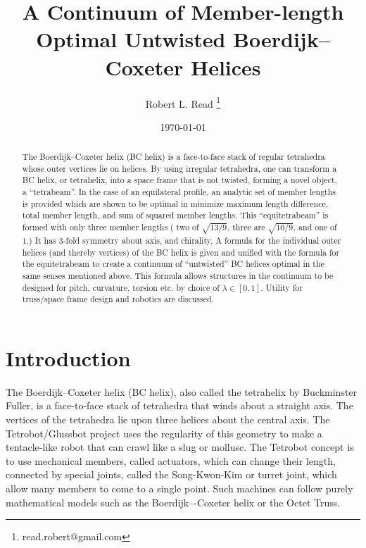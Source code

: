 \documentclass[11pt]{article}
\title{A Continuum of Member-length Optimal Untwisted Boerdijk--Coxeter Helices}
\author{Robert L. Read
  \thanks{read.robert@gmail.com}
}
\affil{Founder, Public Invention, an educational non-profit.}
\date{\today}
\begin{document}
\maketitle


\begin{abstract}
  The Boerdijk--Coxeter helix (BC helix) is a face-to-face stack of regular tetrahedra whose outer vertices lie on helices.
  By using irregular tetrahedra, one can transform a BC helix, or tetrahelix, into a space frame that is not twisted, forming a novel object, a
  ``tetrabeam''.
  In the case of an equilateral profile, an analytic set of member lengths is provided which are shown to be optimal in minimize
  maximum length difference, total member length, and sum of squared member lengths.
  This ``equitetrabeam'' is formed with only three member lengths ( two of $\sqrt{13/9}$, three are $\sqrt{10/9}$, and one of $1$.)
  It has 3-fold symmetry about  axis, and chirality.  
  A formula for the individual outer helices (and thereby vertices) of the BC helix is given and
  unified with the formula for the equitetrabeam to create a continuum of ``untwisted'' BC helices optimal
  in the same senses mentioned above. This formula allows structures in the continuum to be
  designed for pitch, curvature, torsion etc. by choice of $\lambda \in [0,1]$. Utility for truss/space frame design and
  robotics are discussed.
\end{abstract}


\section{Introduction}

The Boerdijk--Coxeter helix\cite{coxeter1985simplicial} (BC helix),
also called the tetrahelix by Buckminster Fuller\cite{fuller1982synergetics},
is a face-to-face stack of tetrahedra that winds about a straight axis.
The vertices of the tetrahedra
lie upon three
helices about the central axis.
The Tetrobot/Glussbot\cite{TetrobotBook} project
uses the regularity of this geometry to make a tentacle-like robot that can crawl like a slug or mollusc.
The Tetrobot concept
is to use mechanical members, called actuators, which can change their length, connected by special joints, called the Song-Kwon-Kim\cite{song2003spherical} or turret joint,
which allow many
members to come to a single point.
Such machines can follow purely mathematical models such as the Boerdijk–-Coxeter helix or the Octet Truss.
\end{document}

